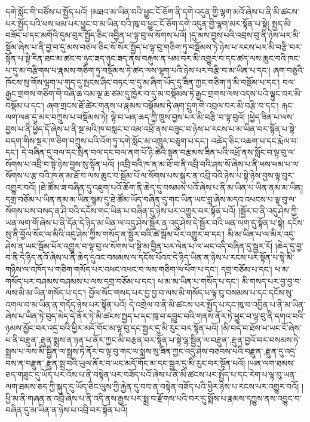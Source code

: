 དགེ་སློང་གི་བཙོས་པ་སྤྱོད་པའོ། །མཐའ་མ་ཡིན་བའི་ཕྱུང་ངོ་ཅོག་ནི་དགེ་འདུན་གྱི་ལྷག་མའོ་ཞེས་པ་ནི་མི་ཚངས་པར་སྤྱོད་པའི་ཕས་ཕམ་པར་ཕྱུང་བ་མ་ཡིན་བའི་ཁུ་བ་ཕྱུང་ངོ་ཅོག་དགེ་འདུན་གྱི་ལྷག་མར་སྟོན་པ་སྟེ། སྤྱད་མི་བཟོད་པ་དང་མགོའི་དུམ་བུར་སྤྱོད་ཅིང་འབྱིན་པ་ལྟ་བུ་ལ་སོགས་པའོ། །དུ་མས་བྱས་པའི་འབྲས་བུ་ནི་ཉེས་པར་མི་སྡོམ་ཞེས་པ་ནི་བྱ་བ་དུ་མས་བཙལ་ཅིང་སོ་སོར་སྤྱོད་པ་ལྟ་བུ་གཅིག་ཏུ་བསྡོམས་ཏེ་ཉེས་པ་རངས་པར་མི་བརྩི་བར་སྟོན་པ་སྟེ་རིན་ཐང་མ་ཚང་བ་ཉུང་ཟད་ཉུང་ཟད་ནས་བརྐུས་ན་ཕམ་བར་མི་འགྱུར་བ་དང་ཚད་ལས་ཆུང་བའི་ཁང་པ་དུ་མ་བརྩིགས་པ་རྣམས་གཅིག་ཏུ་བསྡོམས་ཏེ་ཚད་ལས་ལྷག་པའི་ཉེས་པར་བརྩི་བ་མ་ཡིན་པ་དང་། ཞག་བཅུའི་ཁོངས་སུ་གོས་ལྷག་པ་གུད་དུ་སྤངས་ཤིང་བཏང་བ་དུ་མ་ཞིག་ཡོད་དུ་ཟིན་ཀྱང་གཅིག་ཏུ་མི་བསྡོམ་པ་དང་། བལ་རྒྱང་གྲགས་གཅིག་གི་བཞི་ཆ་འམ་ལྔ་ཆ་ཙམ་དུ་ཁྱེར་བ་དུ་མ་བསྡོམས་ཏེ་རྒྱང་གྲགས་ལས་འདས་པའི་ལྟུང་བར་མི་བསྡོམ་པ་དང་། ཞག་གྲངས་ཐོ་ཚེར་གནས་པ་རྣམས་བསྡོམས་ཏེ་ཞག་དྲུག་གི་འབྲལ་བར་མི་བརྩི་བ་དང་། རྐང་ལག་ལན་དུ་མར་བཀྲུས་པ་བསྡོམས་ཏེ། ལྟེ་བ་ཡན་ཆད་ཀྱི་ཁྲུས་བྱས་པར་མི་བརྩི་བ་ལྟ་བུའོ། །ཕྱེད་ཟིན་པ་ལས་བྱས་པ་ནི་ཕྱེད་དོ་ཞེས་པ་ནི་སྔ་མའི་ཁ་བསླང་བ་འམ་འཕྲོ་ནས་བཟུང་བ་ཉེས་པ་རངས་པ་མ་ཡིན་བར་སྟོན་པ་སྟེ་བདག་གིས་སྔར་ཁ་ཅིག་བཀྲུས་པའི་འོག་ཏུ་དགེ་སློང་མ་འཁྲུར་བཅུག་པ་དང་། འཚེད་ཅིང་འཆག་པ་དང་རྨེལ་བ་དང་། དེ་བཞིན་དུ་བལ་དང་སྲིན་བལ་དང་བལ་ནག་པོ་ཉི་ཚེའི་སྟན་བརྩམས་ཟིན་པའི་འཕྲོ་ནས་སློང་བ་ལྟ་བུ་ལ་སོགས་པ་འབྲི་བ་སྟེ་ཉེས་བྱས་སུ་སྟོན་པའོ། །འབྲི་བའི་ཁ་ན་མ་ཐོ་བ་ནི་འབྲི་བའི་ཤས་སོ་ཞེས་པ་ནི་ཕས་ཕམ་པ་ལ་སོགས་པ་རྩ་བའི་ཁ་ན་མ་ཐོ་བ་ལས་ཆུང་བ་སྦོམ་པོ་ལ་སོགས་པས་སྐུར་ན་འབྲི་བའི་ཉེས་པ་སྟེ་ཉེས་བྱས་ལྟ་བུར་འགྱུར་བའོ། །ཐེ་ཚོམ་ཟ་བཞིན་དུ་འཇུག་པའོ་ཆོག་ནི་ཆེད་དུ་བསམས་པའོ་ཞེས་པ་ནི་མ་ཡིན་པ་ཡིན་ནམ་མ་ཡིན། དགྲ་བཅོམ་པ་ཡིན་ནམ་མ་ཡིན་སྙམ་དུ་ཐེ་ཚོམ་ཡོད་བཞིན་དུ་གང་ཡིན་ཡང་བླ་ཞེས་མདའ་འཕངས་པ་ལྟ་བུ་ལ་སོགས་པས་བསད་ན་ཤི་བའི་དངོས་གང་ཡིན་པ་བཞིན་དུ་ཉེས་པར་འགྱུར་བར་སྟོན་པའོ། །སྦྱོར་བ་ནི་འདུ་ཤེས་ཀྱི་ཡན་ལག་གོ་ཞེས་པ་ནི་དོན་དེ་ཉིད་མ་ཡིན་ལ་འདུ་ཤེས་སྦྱོར་ན་འདུ་ཤེས་དེ་སྦྱོར་བའི་ཡན་ལག་དུ་སྟོན་པ་སྟེ། དངོས་སུ་ནི་བྱོལ་སོང་ལ་མིའི་འདུ་ཤེས་ཀྱིས་གསོད་ན་སྦྱོར་བའི་ཚེ་སྦོམ་པོར་འགྱུར་བ་དང་། མི་མ་ཡིན་པ་ལ་མིར་འདུ་ཤེས་ན་ཡང་སྦོམ་པོར་འགྱུར་བ་ལྟ་བུ་ལ་སོགས་པ་སྟེ་མ་བྱིན་པར་ལེན་པ་ལ་ཡང་འདི་བཞིན་དུ་སྦྱར་རོ། །ཆེད་དུ་བྱ་བ་ནི་དེ་ཉིད་ནའོ་ཞེས་པ་ནི་ཆེད་དུའང་བསམས་ལ་དངོས་པོའང་དེ་ཉིད་ཡིན་ན་ཉེས་པ་རངས་པར་སྟོན་པ་སྟེ་མི་གཉིས་ལ་འཁོད་པ་གཅིག་གསོད་པར་འཕང་འཕང་བ་ལས་གཅིག་ལ་ཕོག་པ་དང་། དགྲ་བཅོམ་པ་དང་། ཕ་མ་གསོད་པར་བཤམས་བཤམས་པ་ལས་དགྲ་བཅོམ་པ་དང་། ཕ་མ་མ་ཡིན་པ་གསོད་པ་དང་། མི་གསད་པར་བྱ་བྱ་བ་ལས་མི་མ་ཡིན་གསོད་པ་དང་། བྱོལ་སོང་གསད་པར་བྱ་བྱ་བ་ལས་མི་གསོད་པ་ལྟ་བུ་བསམས་པ་དང་དངོས་སུ་འགལ་བ་མ་ཡིན་ན་གདོད་ཉེས་པར་སྟོན་པའོ། དེ་འགྲེལ་བ་ནི་མི་ཚངས་པར་སྤྱོད་པ་དང་ཁུ་བ་འབྱིན་པ་ནི་མ་ཡིན་ཞེས་པ་ཡིན་ཏེ་བུད་མེད་དེ་ནོར་ཏེ་མི་ཚངས་སྤྱད་པ་དང་ཁུ་བ་དབྱུང་བའི་གནས་ནོར་ཏེ་ཕྱུང་བ་ལྟ་བུ་ནི་དགའ་བའི་ཉམས་མྱོང་བར་འདྲ་བའི་ཕྱིར་མདོ་གོང་མ་ལྟ་བུ་དང་སྦྱར་དུ་མི་རུང་བར་སྟོན་པའོ། །མི་བདེ་བ་ཐོས་པ་ཡང་ངོ་ཞེས་པ་ནི་{བརྫུན་,རྫུན་}སྨྲས་ན་ཉན་པ་ནོར་ཀྱང་མི་བརྩན་བར་སྟོན་པ་སྟེ་ལྷ་སྦྱིན་ལ་{བརྫུན་,རྫུན་}བྱའོ་བར་བསམས་ཏེ་སྨྲས་པ་ལས་མི་སྦྱིན་ལ་སྨྲས་ཏེ་ནོར་བ་ལྟ་བུ་གང་ལ་སྨྲས་སུ་ཟིན་ཀྱང་འདུ་ཤེས་བཅབས་པའི་{བརྫུན་,རྫུན་}དུ་འདྲ་བས་ན་{བརྫུན་,རྫུན་}སྨྲ་བའི་ཡུལ་ནོར་བ་ཡང་མདོ་གོང་མ་དང་སྦྱར་དུ་མི་རུང་བར་སྟོན་པའོ། །ཡན་ལག་ཐམས་ཅད་གཟུང་དུ་ཡོད་པར་འོས་པ་ནི་བསྟེན་པར་བཟོད་པའོ་ཞེས་པ་ནི་མི་ཚངས་པར་སྤྱོད་པ་དང་རེག་པ་ལྟ་བུ་ཡན་ལག་ཐམས་ཅད་ཀྱི་སྐུད་དུ་ཡོད་ཅིང་ལུས་ཀྱི་རྐྱེན་དུ་བབ་ན་བསྟེན་བཟོད་པའི་ཕྱིར་ཉེས་པ་རངས་པར་འགྱུར་བའོ། །ཕྱི་མ་ནི་གཞན་ན་འབྲི་ཞེས་པ་ནི་འདི་ནས་རྒྱས་པར་སྨྲ་བ་རྫོགས་པའི་བར་དུ་སྨོས་པ་རྣམས་དཀྱུས་ནས་འབྱུང་བ་བཞིན་དུ་མ་ཡིན་ན་ཉེས་པ་འབྲི་བར་སྟོན་པའོ། 